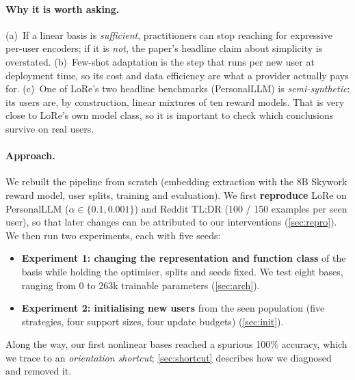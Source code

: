 \documentclass[11pt,a4paper]{article}
\begin{document}
\paragraph{Why it is worth asking.} (a)~If a linear basis is \emph{sufficient}, practitioners can stop
reaching for expressive per-user encoders; if it is \emph{not}, the paper's headline claim about
simplicity is overstated. (b)~Few-shot adaptation is the step that runs per new user at deployment
time, so its cost and data efficiency are what a provider actually pays for. (c)~One of LoRe's two
headline benchmarks (PersonalLLM) is \emph{semi-synthetic}: its users are, by construction, linear
mixtures of ten reward models. That is very close to LoRe's own model class, so it is important to
check which conclusions survive on real users.

\paragraph{Approach.} We rebuilt the pipeline from scratch (embedding extraction with the 8B Skywork
reward model, user splits, training and evaluation). We first \textbf{reproduce} LoRe on PersonalLLM
($\alpha\in\{0.1,0.001\}$) and Reddit TL;DR (100 / 150 examples per seen user), so that later changes
can be attributed to our interventions (\cref{sec:repro}). We then run two experiments, each with five
seeds:
\begin{itemize}
\item \textbf{Experiment 1: changing the representation and function class} of the basis while holding the
optimiser, splits and seeds fixed. We test eight bases, ranging from 0 to 263k trainable parameters (\cref{sec:arch}).
\item \textbf{Experiment 2: initialising new users} from the seen population (five strategies, four
support sizes, four update budgets) (\cref{sec:init}).
\end{itemize}
Along the way, our first nonlinear bases reached a spurious 100\% accuracy, which we trace to an
\emph{orientation shortcut}; \cref{sec:shortcut} describes how we diagnosed and removed it.
\end{document}

